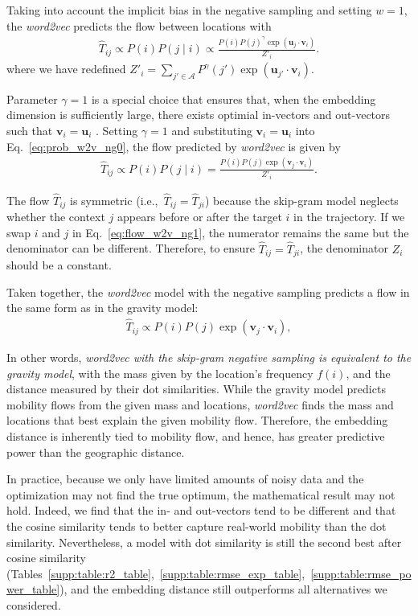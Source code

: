 \documentclass[12pt,a4paper]{article}
\newcommand{\vect}[1]{\boldsymbol{#1}}
\def\given{\mid}
\def\ie{i.e.,~}
\begin{document}
Taking into account the implicit bias in the negative sampling  and setting $w=1$, the \textit{word2vec} predicts the flow between locations with
\begin{align}
	\widehat{T}_{ij} \propto  P(i) P(j\given i) \propto  \frac{P(i) P(j)^\gamma \exp(\vect{u}_j \cdot \vect{v}_{i})}{Z'_i}. \label{eq:prob_w2v_ng0}
\end{align}
where we have redefined $Z'_i=\sum_{j' \in \mathcal{A}}  P^\gamma(j') \exp(\vect{u}_{j'} \cdot \vect{v}_{i})$.

Parameter $\gamma=1$ is a special choice that ensures that, when the embedding dimension is sufficiently large, there exists optimial in-vectors and out-vectors such that $\vect{v}_i = \vect{u}_i$ \autocite{levy2014neural}.
Setting $\gamma = 1$ and substituting $\vect{v}_i = \vect{u}_i$ into Eq.~\ref{eq:prob_w2v_ng0}, the flow predicted by {\it word2vec} is given by
\begin{align}
	\widehat{T}_{ij} \propto  P(i) P(j\given i) = \frac{P(i)P(j)\exp(\vect{v}_j \cdot \vect{v}_{i})}{Z'_i}. \label{eq:flow_w2v_ng1}
\end{align}

The flow $\widehat{T}_{ij}$ is symmetric (\ie $\widehat{T}_{ij}=\widehat{T}_{ji}$) because the skip-gram model neglects whether the context $j$ appears before or after the target $i$ in the trajectory.
If we swap $i$ and $j$ in Eq.~\ref{eq:flow_w2v_ng1}, the numerator remains the same but the denominator can be different.
Therefore, to ensure $\widehat{T}_{ij}=\widehat{T}_{ji}$, the denominator $Z_i$ should be a constant.

Taken together, the {\it word2vec} model with the negative sampling predicts a flow in the same form as in the gravity model:
\begin{align}
	\widehat{T}_{ij} \propto  P(i) P(j)  \exp(\vect{v}_j \cdot \vect{v}_{i}), \label{eq:flow_w2v_ng0}
\end{align}

In other words, \emph{word2vec with the skip-gram negative sampling is equivalent to the gravity model}, with the mass given by the location's frequency $f(i)$, and the distance measured by their dot similarities.
While the gravity model predicts mobility flows from the given mass and locations, {\it word2vec} finds the mass and locations that best explain the given mobility flow.
Therefore, the embedding distance is inherently tied to mobility flow, and hence, has greater predictive power than the geographic distance.

In practice, because we only have limited amounts of noisy data and the optimization may not find the true optimum, the mathematical result may not hold.
Indeed, we find that the in- and out-vectors tend to be different and that the cosine similarity tends to better capture real-world mobility than the dot similarity.
Nevertheless, a model with dot similarity is still the second best after cosine similarity (Tables~\ref{supp:table:r2_table},~\ref{supp:table:rmse_exp_table},~\ref{supp:table:rmse_power_table}), and the embedding distance still outperforms all alternatives we considered.
\end{document}
